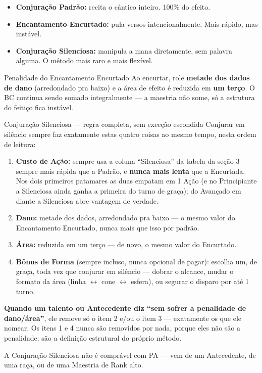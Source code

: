 \begin{itemize}
    \item \textbf{Conjuração Padrão:} recita o cântico inteiro. 100\% do efeito.
    \item \textbf{Encantamento Encurtado:} pula versos intencionalmente. Mais rápido, mas
          instável.
    \item \textbf{Conjuração Silenciosa:} manipula a mana diretamente, sem palavra alguma.
          O método mais raro e mais flexível.
\end{itemize}

\begin{aviso}{Penalidade do Encantamento Encurtado}
    Ao encurtar, role \textbf{metade dos dados de dano} (arredondado pra baixo) e a área de
    efeito é reduzida em \textbf{um terço}. O BC continua sendo somado integralmente --- a
    maestria não some, só a estrutura do feitiço fica instável.
\end{aviso}

\begin{nota}{Conjuração Silenciosa --- regra completa, sem exceção escondida}
    Conjurar em silêncio sempre faz exatamente estas quatro coisas ao mesmo tempo, nesta
    ordem de leitura:

    \begin{enumerate}
        \item \textbf{Custo de Ação:} sempre usa a coluna \enquote{Silenciosa} da tabela da
              seção 3 --- sempre mais rápida que a Padrão, e \textbf{nunca mais lenta} que
              a Encurtada. Nos dois primeiros patamares as duas empatam em 1 Ação (e no
              Principiante a Silenciosa ainda ganha a primeira do turno de graça); do
              Avançado em diante a Silenciosa abre vantagem de verdade.
        \item \textbf{Dano:} metade dos dados, arredondado pra baixo --- o mesmo valor do
              Encantamento Encurtado, nunca mais que isso por padrão.
        \item \textbf{Área:} reduzida em um terço --- de novo, o mesmo valor do Encurtado.
        \item \textbf{Bônus de Forma} (sempre incluso, nunca opcional de pagar): escolha
              um, de graça, toda vez que conjurar em silêncio --- dobrar o alcance, mudar o
              formato da área (linha $\leftrightarrow$ cone $\leftrightarrow$ esfera), ou
              segurar o disparo por até 1 turno.
    \end{enumerate}

    \medskip
    \textbf{Quando um talento ou Antecedente diz \enquote{sem sofrer a penalidade de
    dano/área}}, ele remove só o item 2 e/ou o item 3 --- exatamente os que ele nomear. Os
    itens 1 e 4 nunca são removidos por nada, porque eles não são a penalidade: são a
    definição estrutural do próprio método.

    \medskip
    A Conjuração Silenciosa não é comprável com PA --- vem de um Antecedente, de uma raça,
    ou de uma Maestria de Rank alto.
\end{nota}

